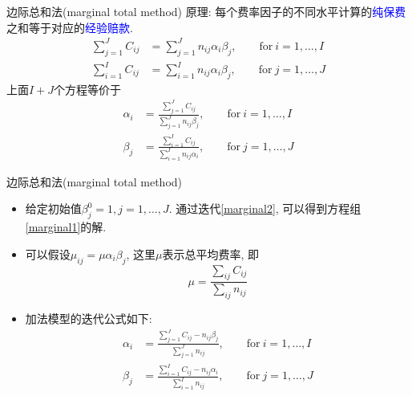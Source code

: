 \documentclass[professionalfont]{beamer}
\newcommand{\blue}[1]{\textcolor{blue}{#1}}
\begin{document}
\begin{frame}{边际总和法(marginal total method)}
原理: 每个费率因子的不同水平计算的\blue{纯保费}之和等于对应的\blue{经验赔款}.
\begin{equation}\label{marginal1}
\begin{aligned}
\sum_{j=1}^{J}C_{ij}&=\sum_{j=1}^{J}n_{ij}\alpha_i\beta_j,\qquad \text{for} ~ i=1,\ldots,I\\
\sum_{i=1}^{I}C_{ij}&=\sum_{i=1}^{I}n_{ij}\alpha_i\beta_j,\qquad \text{for} ~ j=1,\ldots,J
\end{aligned}
\end{equation}
上面$I+J$个方程等价于
\begin{equation}\label{marginal2}
\begin{aligned}
\alpha_i&=\frac{\sum_{j=1}^{J}C_{ij}}{\sum_{j=1}^{J}n_{ij}\beta_j},\qquad \text{for} ~ i=1,\ldots,I\\
\beta_j&=\frac{\sum_{i=1}^{I}C_{ij}}{\sum_{i=1}^{I}n_{ij}\alpha_i},\qquad \text{for} ~ j=1,\ldots,J
\end{aligned}
\end{equation}
\end{frame}
\begin{frame}{边际总和法(marginal total method)}
\begin{itemize}
	\item 给定初始值$\beta^0_j=1, j=1,\ldots, J$. 通过迭代\eqref{marginal2}, 可以得到方程组\eqref{marginal1}的解.
	\item 可以假设$\mu_{ij}=\mu\alpha_i\beta_j$, 这里$\mu$表示总平均费率, 即$$\mu=\frac{\sum_{ij}C_{ij}}{\sum_{ij}n_{ij}}$$
	\item 加法模型的迭代公式如下:
	\begin{equation}\label{marginal3}
	\begin{aligned}
	\alpha_i&=\frac{\sum_{j=1}^{J}C_{ij}-n_{ij}\beta_j}{\sum_{j=1}^{J}n_{ij}},\qquad \text{for} ~ i=1,\ldots,I\\
	\beta_j&=\frac{\sum_{i=1}^{I}C_{ij}-n_{ij}\alpha_i}{\sum_{i=1}^{I}n_{ij}},\qquad \text{for} ~ j=1,\ldots,J
	\end{aligned}
	\end{equation}
\end{itemize}
\end{frame}
\end{document}
